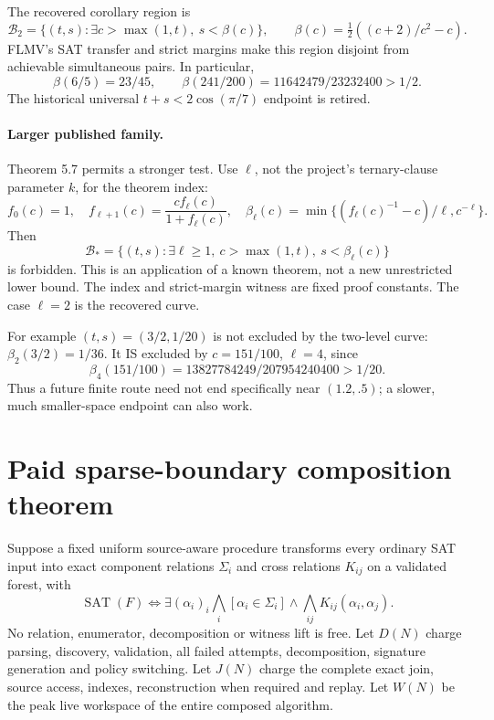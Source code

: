 \documentclass[11pt]{article}
\begin{document}
The recovered corollary region is
\[
\mathcal B_2=\{(t,s):\exists c>\max(1,t),\ s<\beta(c)\},\qquad
\beta(c)=\tfrac12((c+2)/c^2-c).
\]
FLMV's SAT transfer and strict margins make this region disjoint from achievable simultaneous pairs. In particular,
\[
\beta(6/5)=23/45,\qquad
\beta(241/200)=11642479/23232400>1/2.
\]
The historical universal $t+s<2\cos(\pi/7)$ endpoint is retired.

\paragraph{Larger published family.}
Theorem 5.7 permits a stronger test. Use $\ell$, not the project's ternary-clause parameter $k$, for the theorem index:
\[
f_0(c)=1,\quad f_{\ell+1}(c)=\frac{cf_\ell(c)}{1+f_\ell(c)},\quad
\beta_\ell(c)=\min\{(f_\ell(c)^{-1}-c)/\ell,c^{-\ell}\}.
\]
Then
\[
\mathcal B_* =\{(t,s):\exists \ell\ge1,\ c>\max(1,t),\ s<\beta_\ell(c)\}
\]
is forbidden. This is an application of a known theorem, not a new unrestricted lower bound. The index and strict-margin witness are fixed proof constants. The case $\ell=2$ is the recovered curve.

For example $(t,s)=(3/2,1/20)$ is not excluded by the two-level curve: $\beta_2(3/2)=1/36$. It IS excluded by $c=151/100$, $\ell=4$, since
\[
\beta_4(151/100)=13827784249/207954240400>1/20.
\]
Thus a future finite route need not end specifically near $(1.2,.5)$; a slower, much smaller-space endpoint can also work.

\section{Paid sparse-boundary composition theorem}
Suppose a fixed uniform source-aware procedure transforms every ordinary SAT input into exact component relations $\Sigma_i$ and cross relations $K_{ij}$ on a validated forest, with
\[
\operatorname{SAT}(F)\iff\exists(\alpha_i)_i\bigwedge_i[\alpha_i\in\Sigma_i]\wedge\bigwedge_{ij}K_{ij}(\alpha_i,\alpha_j).
\]
No relation, enumerator, decomposition or witness lift is free. Let $D(N)$ charge parsing, discovery, validation, all failed attempts, decomposition, signature generation and policy switching. Let $J(N)$ charge the complete exact join, source access, indexes, reconstruction when required and replay. Let $W(N)$ be the peak live workspace of the entire composed algorithm.
\end{document}
